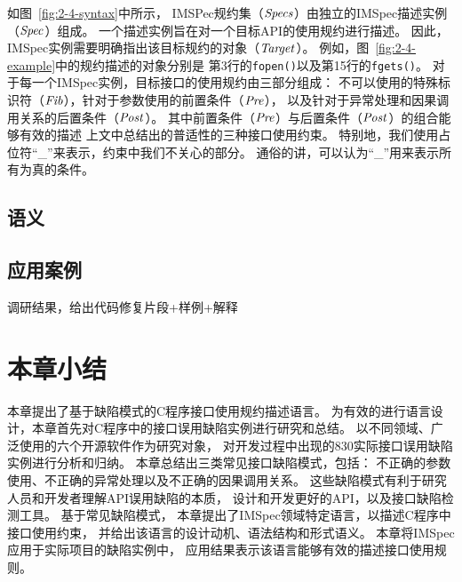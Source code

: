 

如图~\ref{fig:2-4-syntax}中所示，
IMSPec规约集（$\mathit{Specs}$）由独立的IMSpec描述实例（$\mathit{Spec}$）组成。
一个描述实例旨在对一个目标API的使用规约进行描述。
因此，IMSpec实例需要明确指出该目标规约的对象（$\mathit{Target}$）。
例如，图~\ref{fig:2-4-example}中的规约描述的对象分别是
第3行的\texttt{fopen()}以及第15行的\texttt{fgets()}。
对于每一个IMSpec实例，目标接口的使用规约由三部分组成：
不可以使用的特殊标识符（$\mathit{Fib}$），针对于参数使用的前置条件（$\mathit{Pre}$），
以及针对于异常处理和因果调用关系的后置条件（$\mathit{Post}$）。
其中前置条件（$\mathit{Pre}$）与后置条件（$\mathit{Post}$）的组合能够有效的描述
上文中总结出的普适性的三种接口使用约束。
特别地，我们使用占位符“\_”来表示，约束中我们不关心的部分。
通俗的讲，可以认为“\_”用来表示所有为真的条件。














\subsection{语义}

\subsection{应用案例}
调研结果，给出代码修复片段+样例+解释

\section{本章小结}
\label{sec:2.5}
本章提出了基于缺陷模式的C程序接口使用规约描述语言。
为有效的进行语言设计，本章首先对C程序中的接口误用缺陷实例进行研究和总结。
以不同领域、广泛使用的六个开源软件作为研究对象，
对开发过程中出现的830实际接口误用缺陷实例进行分析和归纳。
本章总结出三类常见接口缺陷模式，包括：
不正确的参数使用、不正确的异常处理以及不正确的因果调用关系。
这些缺陷模式有利于研究人员和开发者理解API误用缺陷的本质，
设计和开发更好的API，以及接口缺陷检测工具。
基于常见缺陷模式，
本章提出了IMSpec领域特定语言，以描述C程序中接口使用约束，
并给出该语言的设计动机、语法结构和形式语义。
本章将IMSpec应用于实际项目的缺陷实例中，
应用结果表示该语言能够有效的描述接口使用规则。